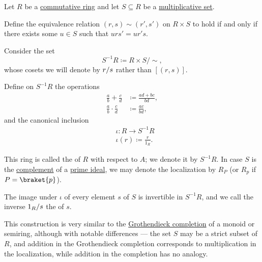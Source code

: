 \begin{definition}\label{def:ring_localization}
  Let \( R \) be a \hyperref[def:ring/commutative]{commutative ring} and let \( S \subseteq R \) be a \hyperref[def:multiplicative_set_in_semiring]{multiplicative set}.

  Define the equivalence relation \( (r, s) \sim (r', s') \) on \( R \times S \) to hold if and only if there exists some \( u \in S \) such that \( u r s' = u r' s \).

  Consider the set
  \begin{equation*}
    S^{-1} R \coloneqq R \times S / \sim,
  \end{equation*}
  whose cosets we will denote by \( \ifrac r s \) rather than \( [(r, s)] \).

  Define on \( S^{-1} R \) the operations
  \begin{align*}
    \frac a b + \frac c d     &\coloneqq \frac {a d + b c} {b d}, \\
    \frac a b \cdot \frac c d &\coloneqq \frac {a c} {b d},
  \end{align*}
  and the canonical inclusion
  \begin{equation*}
    \begin{aligned}
      &\iota: R \to S^{-1} R \\
      &\iota(r) \coloneqq \frac r {1_R}.
    \end{aligned}
  \end{equation*}

  This ring is called the  of \( R \) with respect to \( A \); we denote it by \( S^{-1} R \). In case \( S \) is the \hyperref[thm:boolean_algebra_of_subsets/complement]{complement} of a \hyperref[def:semiring_ideal/prime]{prime ideal}, we may denote the localization by \( R_P \) (or \( R_p \) if \( P = \braket{ p } \)).

  The image under \( \iota \) of every element \( s \) of \( S \) is invertible in \( S^{-1} R \), and we call the inverse \( \ifrac {1_R} s \) the  of \( s \).

  This construction is very similar to the \hyperref[def:monoid_grothendieck_completion]{Grothendieck completion} of a monoid or semiring, although with notable differences --- the set \( S \) may be a strict subset of \( R \), and addition in the Grothendieck completion corresponds to multiplication in the localization, while addition in the completion has no analogy.
\end{definition}
